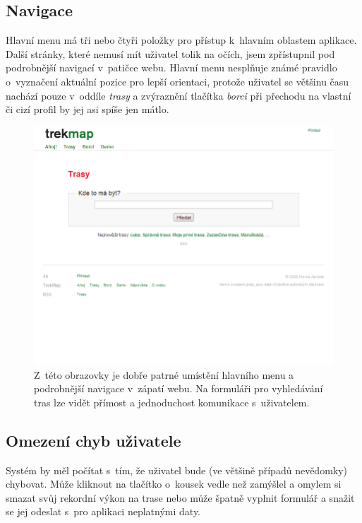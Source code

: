 \subsection{Navigace}
Hlavní menu má tři nebo čtyři položky pro přístup k~hlavním
oblastem aplikace. Další stránky, které nemusí mít uživatel tolik na
očích, jsem zpřístupnil pod podrobnější navigací v~patičce webu.
Hlavní menu nesplňuje známé pravidlo o~vyznačení aktuální pozice pro
lepší orientaci, protože uživatel se většinu času nachází pouze
v~oddíle {\it trasy} a zvýraznění tlačítka {\it borci} při přechodu na
vlastní či cizí profil by jej asi spíše jen mátlo.

\begin{figure}[h]
	\includegraphics[width=\textwidth, keepaspectratio]{fig/screennav}
	\caption{Z~této obrazovky je dobře patrné umístění hlavního menu a
	podrobnější navigace v~zápatí webu. Na formuláři pro vyhledávání tras lze
	vidět přímost a jednoduchost komunikace s~uživatelem.}
	\label{obrGoogleMap}
\end{figure}

\subsection{Omezení chyb uživatele}
Systém by měl počítat s~tím, že uživatel bude (ve většině případů
nevědomky) chybovat. Může kliknout na tlačítko o~kousek vedle než
zamýšlel a omylem si smazat svůj rekordní výkon na trase nebo může
špatně vyplnit formulář a snažit se jej odeslat s~pro aplikaci neplatnými daty.

